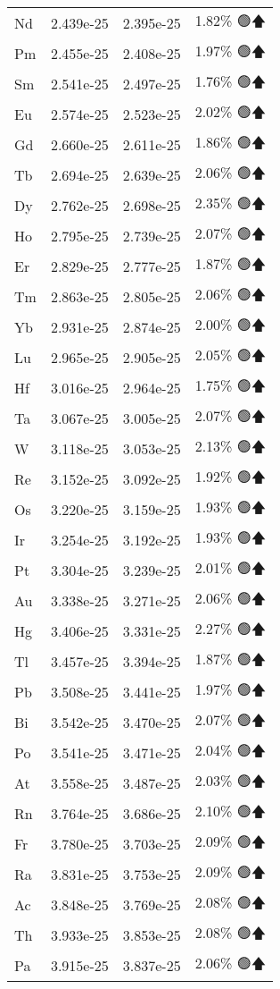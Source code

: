 \begin{longtable}{|l|c|c|c|}
Nd & 2.439e-25 & 2.395e-25 & 1.82\% 🟢🡅 \\
Pm & 2.455e-25 & 2.408e-25 & 1.97\% 🟢🡅 \\
Sm & 2.541e-25 & 2.497e-25 & 1.76\% 🟢🡅 \\
Eu & 2.574e-25 & 2.523e-25 & 2.02\% 🟢🡅 \\
Gd & 2.660e-25 & 2.611e-25 & 1.86\% 🟢🡅 \\
Tb & 2.694e-25 & 2.639e-25 & 2.06\% 🟢🡅 \\
Dy & 2.762e-25 & 2.698e-25 & 2.35\% 🟢🡅 \\
Ho & 2.795e-25 & 2.739e-25 & 2.07\% 🟢🡅 \\
Er & 2.829e-25 & 2.777e-25 & 1.87\% 🟢🡅 \\
Tm & 2.863e-25 & 2.805e-25 & 2.06\% 🟢🡅 \\
Yb & 2.931e-25 & 2.874e-25 & 2.00\% 🟢🡅 \\
Lu & 2.965e-25 & 2.905e-25 & 2.05\% 🟢🡅 \\
Hf & 3.016e-25 & 2.964e-25 & 1.75\% 🟢🡅 \\
Ta & 3.067e-25 & 3.005e-25 & 2.07\% 🟢🡅 \\
W & 3.118e-25 & 3.053e-25 & 2.13\% 🟢🡅 \\
Re & 3.152e-25 & 3.092e-25 & 1.92\% 🟢🡅 \\
Os & 3.220e-25 & 3.159e-25 & 1.93\% 🟢🡅 \\
Ir & 3.254e-25 & 3.192e-25 & 1.93\% 🟢🡅 \\
Pt & 3.304e-25 & 3.239e-25 & 2.01\% 🟢🡅 \\
Au & 3.338e-25 & 3.271e-25 & 2.06\% 🟢🡅 \\
Hg & 3.406e-25 & 3.331e-25 & 2.27\% 🟢🡅 \\
Tl & 3.457e-25 & 3.394e-25 & 1.87\% 🟢🡅 \\
Pb & 3.508e-25 & 3.441e-25 & 1.97\% 🟢🡅 \\
Bi & 3.542e-25 & 3.470e-25 & 2.07\% 🟢🡅 \\
Po & 3.541e-25 & 3.471e-25 & 2.04\% 🟢🡅 \\
At & 3.558e-25 & 3.487e-25 & 2.03\% 🟢🡅 \\
Rn & 3.764e-25 & 3.686e-25 & 2.10\% 🟢🡅 \\
Fr & 3.780e-25 & 3.703e-25 & 2.09\% 🟢🡅 \\
Ra & 3.831e-25 & 3.753e-25 & 2.09\% 🟢🡅 \\
Ac & 3.848e-25 & 3.769e-25 & 2.08\% 🟢🡅 \\
Th & 3.933e-25 & 3.853e-25 & 2.08\% 🟢🡅 \\
Pa & 3.915e-25 & 3.837e-25 & 2.06\% 🟢🡅 \\

\end{longtable}
